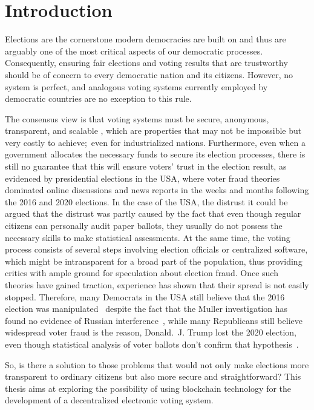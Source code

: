 \chapter{Introduction}
\label{ch:intro}

Elections are the cornerstone modern democracies are built on and thus are arguably one of the most critical aspects of our democratic processes.
Consequently, ensuring fair elections and voting results that are trustworthy should be of concern to every democratic nation and its citizens.
However, no system is perfect, and analogous voting systems currently employed by democratic countries are no exception to this rule.

The consensus view is that voting systems must be secure, anonymous, transparent, and scalable
\autocites{lowry_desirable_2009}[5]{agora_agora_nodate}[9-11]{jafar_blockchain_2021},
which are properties that may not be impossible but very costly to achieve;\ even for industrialized nations.
Furthermore, even when a government allocates the necessary funds to secure its election processes, there is still no guarantee that this will ensure voters' trust in the election result,
as evidenced by presidential elections in the \Gls{USA}, where voter fraud theories dominated online discussions and news reports in the weeks and months following the 2016 and 2020 elections.
In the case of the \Gls{USA}, the distrust it could be argued that the distrust was partly caused by the fact that even though regular citizens can personally audit paper ballots, they usually do not possess the necessary skills to make statistical assessments.
At the same time, the voting process consists of several steps involving election officials or centralized software, which might be intransparent for a broad part of the population, thus providing critics with ample ground for speculation about election fraud.
Once such theories have gained traction, experience has shown that their spread is not easily stopped.
Therefore, many Democrats in the \Gls{USA} still believe that the 2016 election was manipulated~\autocite{sinclair_its_2018}
despite the fact that the Muller investigation has found no evidence of Russian interference~\autocite{muller_report_2019}, while many Republicans still believe widespread voter fraud is the reason,
Donald.\ J. Trump lost the 2020 election, even though statistical analysis of voter ballots don't confirm that hypothesis~\autocite{eggers_no_2021}.

So, is there a solution to those problems that would not only make elections more transparent to ordinary citizens but also more secure and straightforward?
This thesis aims at exploring the possibility of using blockchain technology for the development of a decentralized electronic voting system.


